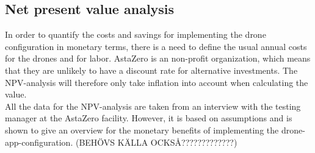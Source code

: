 \subsection{Net present value analysis}
In order to quantify the costs and savings for implementing the drone configuration in monetary terms, there is a need to define the usual annual costs for the drones and for labor. AstaZero is an non-profit organization, which means that they are unlikely to have a discount rate for alternative investments. The NPV-analysis will therefore only take inflation into account when calculating the value. 
\\

All the data for the NPV-analysis are taken from an interview with the testing manager at the AstaZero facility. However, it is based on assumptions and is shown to give an overview for the monetary benefits of implementing the drone-app-configuration. 
(BEHÖVS KÄLLA OCKSÅ?????????????)

